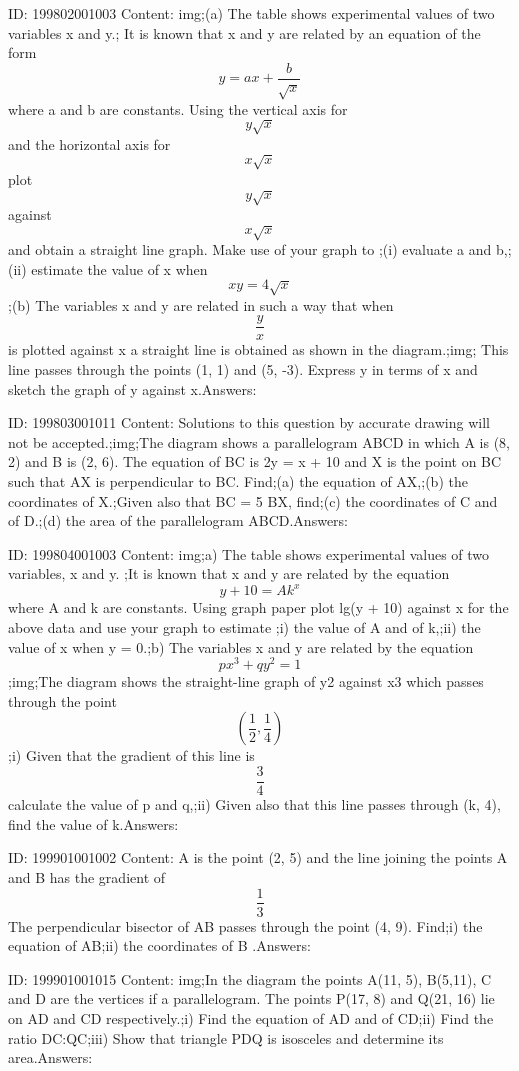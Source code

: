 \documentclass{article}
\begin{document}
ID: 199802001003
Content:
img;(a) The table shows experimental values of two variables x and y.; It is known that x and y are related by an equation of the form \[y=ax+\frac{b}{\sqrt{x}}\] where a and b are constants. Using the vertical axis for \[y\sqrt{x}\] and the horizontal axis for \[x\sqrt{x}\] plot \[y\sqrt{x}\] against \[x\sqrt{x}\] and obtain a straight line graph. Make use of your graph to ;(i) evaluate a and b,;(ii) estimate the value of x when \[xy=4\sqrt{x}\];(b) The variables x and y are related in such a way that when \[\frac{y}{x}\] is plotted against x a straight line is obtained as shown in the diagram.;img; This line passes through the points (1, 1) and (5, -3). Express y in terms of x and sketch the graph of y against x.Answers:

ID: 199803001011
Content:
Solutions to this question by accurate drawing will not be accepted.;img;The diagram shows a parallelogram ABCD in which A is (8, 2) and B is (2, 6). The equation of BC is 2y = x + 10 and X is the point on BC such that AX is perpendicular to BC. Find;(a)	the equation of AX,;(b)	the coordinates of X.;Given also that BC = 5 BX, find;(c)	the coordinates of C and of D.;(d)	the area of the parallelogram ABCD.Answers:

ID: 199804001003
Content:
img;a) The table shows experimental values of two variables, x and y.  ;It is known that x and y are related by the equation \[y+10=Ak^x\] where A and k are constants. Using graph paper plot lg(y + 10) against x for the above data and use your graph to estimate ;i) the value of A and of k,;ii) the value of x when y = 0.;b) The variables x and y are related by the equation \[px^3+qy^2=1\];img;The diagram shows the straight-line graph of y2 against x3 which passes through the point \[(\frac{1}{2},\frac{1}{4})\] ;i) Given that the gradient of this line is \[\frac{3}{4}\] calculate the value of p and q,;ii) Given also that this line passes through (k, 4), find the value of k.Answers:

ID: 199901001002
Content:
A is the point (2, 5) and the line joining the points A and B has the gradient of \[\frac{1}{3}\] The perpendicular bisector of AB passes through the point (4, 9). Find;i) the equation of AB;ii) the coordinates of B .Answers:

ID: 199901001015
Content:
img;In the diagram the points A(11, 5), B(5,11), C and D are the vertices if a parallelogram. The points P(17, 8) and Q(21, 16) lie on AD and CD respectively.;i) Find the equation of AD and of CD;ii) Find the ratio DC:QC;iii) Show that triangle PDQ is isosceles and determine its area.Answers:
\end{document}
